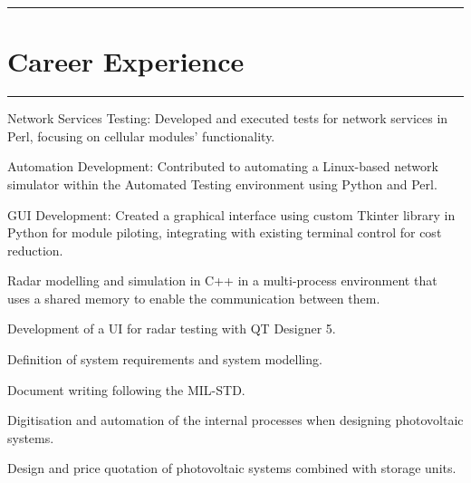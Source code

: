 \documentclass[]{dske-resume-openfont}
\newcommand{\sectionwithlines}[1]{%
    \vspace{0.5cm}%
    {\noindent\rule{\linewidth}{0.4pt}}%
    \section{#1}%
    {\noindent\rule{\linewidth}{0.4pt}}%
    \vspace{0.3cm}%
}
\begin{document}
\begin{minipage}[t]{0.66\textwidth} 


\sectionwithlines{Career Experience}
\sectionsep

\vspace{\topsep}
\begin{tightemize}
\item Network Services Testing: Developed and executed tests for network services in Perl, focusing on cellular modules' functionality.
\item Automation Development: Contributed to automating a Linux-based network simulator within the Automated Testing environment using Python and Perl.
\item GUI Development: Created a graphical interface using custom Tkinter library in Python for module piloting, integrating with existing terminal control for cost reduction.
\end{tightemize}
\sectionsep

\vspace{\topsep} %
\begin{tightemize}
\item Radar modelling and simulation in C++ in a multi-process environment that uses a shared memory to enable the communication between them.
\item Development of a UI for radar testing with QT Designer 5.
\item Definition of system requirements and system modelling.
\item Document writing following the MIL-STD.

\end{tightemize}

\sectionsep

\vspace{\topsep} %
\begin{tightemize}
\item Digitisation and automation of the internal processes when designing photovoltaic systems.
\item Design and price quotation of photovoltaic systems combined with storage units.
\end{tightemize}



\end{minipage}
\end{document}
